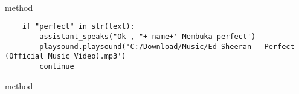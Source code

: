 \\
\\
\\
\\
\\
\\
\\
\\
\\
\\
\\
\\
\\
\\
\\
\\
\\
\\
\\
\\
\\
\\
\\
\\
\\
 method 
 \begin{lstlisting}
    if "perfect" in str(text):
        assistant_speaks("Ok , "+ name+' Membuka perfect')
        playsound.playsound('C:/Download/Music/Ed Sheeran - Perfect (Official Music Video).mp3')
        continue
 \end{lstlisting}
  method 
\\
\\
\\
\\
\\
\\
\\
\\
\\
\\
\\
\\
\\
\\
\\
\\
\\
\\
\\
\\
\\
\\
\\
\\
\\
\\
\\
\\
